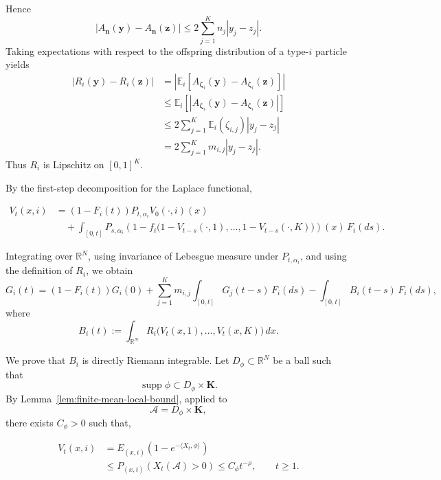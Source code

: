 \documentclass[reqno,final,11pt]{amsart}
\newcommand{\1}{\mathbbm{1}}
\theoremstyle{plain}
\theoremstyle{definition}
\theoremstyle{remark}
\begin{document}
Hence
\[
|A_{\mathbf n}(\mathbf y)-A_{\mathbf n}(\mathbf z)|
\le
2\sum_{j=1}^K n_j|y_j-z_j|.
\]
Taking expectations with respect to the offspring distribution of a type-\(i\)
particle yields
\[
\begin{aligned}
|R_i(\mathbf y)-R_i(\mathbf z)|
&=
\left|
\mathbb E_i\left[
A_{\boldsymbol\zeta_i}(\mathbf y)
-
A_{\boldsymbol\zeta_i}(\mathbf z)
\right]
\right| \\
&\le
\mathbb E_i\left[
\left|
A_{\boldsymbol\zeta_i}(\mathbf y)
-
A_{\boldsymbol\zeta_i}(\mathbf z)
\right|
\right] \\
&\le
2\sum_{j=1}^K \mathbb E_i(\zeta_{i,j})|y_j-z_j| \\
&=
2\sum_{j=1}^K m_{i,j}|y_j-z_j|.
\end{aligned}
\]
Thus \(R_i\) is Lipschitz on \([0,1]^K\).

By the first-step decomposition for the Laplace functional,

\begin{equation}\label{V_t_equation}
\begin{split}
 V_t(x,i)
 &=
 (1-F_i(t))P_{t,\alpha_i}V_0(\cdot,i)(x)
 \\
 &\quad+
 \int_{[0,t]}
 P_{s,\alpha_i}
 \left(
 1-f_i\bigl(1-V_{t-s}(\cdot,1),\dots,1-V_{t-s}(\cdot,K)\bigr)
 \right)(x)\,F_i(ds).
\end{split}
\end{equation}



Integrating over \(\mathbb R^N\), using invariance of Lebesgue measure under
\(P_{t,\alpha_i}\), and using the definition of \(R_i\), we obtain
 \begin{equation}\label{eq:K-renewal-first-step}
 G_i(t)
 =
 (1-F_i(t))G_i(0)
 +
 \sum_{j=1}^K m_{i,j}\int_{[0,t]}G_j(t-s)\,F_i(ds)
 -
 \int_{[0,t]} B_i(t-s)\,F_i(ds),
 \end{equation}
where
\[
B_i(t):=
\int_{\mathbb R^N}
R_i\bigl(V_t(x,1),\dots,V_t(x,K)\bigr)\,dx.
\]

We prove that \(B_i\) is directly Riemann integrable. Let
\(D_\phi\subset\mathbb R^N\) be a ball such that
\[
\operatorname{supp}\phi\subset D_\phi\times\mathbf K.
\]
By Lemma~\ref{lem:finite-mean-local-bound}, applied to
\[
\mathcal A=D_\phi\times\mathbf K,
\]
there exists \(C_\phi>0\) such that, 



\begin{equation*}
\begin{split}
V_t(x,i)
&=
E_{(x,i)}
\left(1-e^{-\langle X_t,\phi\rangle}\right)
\\
&\le
P_{(x,i)}
\left(X_t(\mathcal A)>0\right)
\le
C_{\phi}t^{-\rho},
\qquad t\ge1.
\end{split}
\end{equation*}
\end{document}
